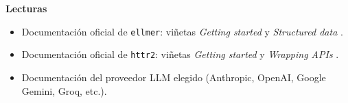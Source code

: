 \documentclass[11pt,letterpaper]{article}
\begin{document}
\noindent\textbf{Lecturas}
\begin{itemize}[leftmargin=*, itemsep=1pt]
    \item Documentación oficial de \texttt{ellmer}: viñetas \textit{Getting started} y \textit{Structured data} \cite{wickham-ellmer}.
    \item Documentación oficial de \texttt{httr2}: viñetas \textit{Getting started} y \textit{Wrapping APIs} \cite{wickham-httr2}.
    \item Documentación del proveedor LLM elegido (Anthropic, OpenAI, Google Gemini, Groq, etc.).
\end{itemize}

\printbibliography[title={Referencias}]
\end{document}
